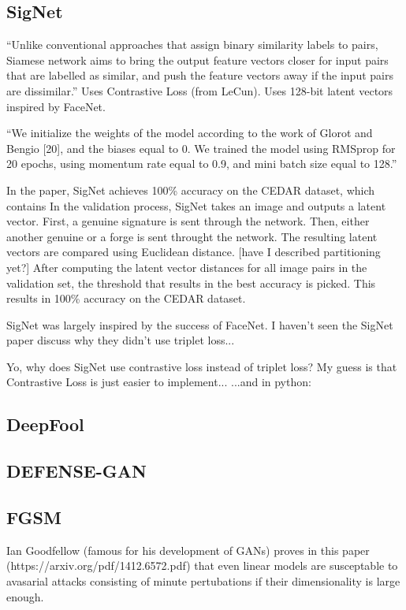 \subsection{SigNet}
``Unlike conventional approaches that assign
binary similarity labels to pairs, Siamese network aims to bring
the output feature vectors closer for input pairs that are labelled
as similar, and push the feature vectors away if the input pairs
are dissimilar.''
Uses Contrastive Loss (from LeCun).
Uses 128-bit latent vectors inspired by FaceNet.

``We initialize the weights of the model according to the work
of Glorot and Bengio [20], and the biases equal to 0. We trained
the model using RMSprop for 20 epochs, using momentum rate
equal to 0.9, and mini batch size equal to 128.''

In the paper, SigNet achieves 100\% accuracy on the CEDAR dataset, which contains 
In the validation process, SigNet takes an image and outputs a latent vector.
First, a genuine signature is sent through the network.
Then, either another genuine or a forge is sent throught the network.
The resulting latent vectors are compared using Euclidean distance.
[have I described partitioning yet?]
After computing the latent vector distances for all image pairs in the validation set, the threshold that results in the best accuracy is picked.
This results in 100\% accuracy on the CEDAR dataset.

SigNet was largely inspired by the success of FaceNet.
I haven't seen the SigNet paper discuss why they didn't use triplet loss...

Yo, why does SigNet use contrastive loss instead of triplet loss?
    My guess is that Contrastive Loss is just easier to implement...
\cite{sig_net}
\cite{GitHub_sounakdey}
...and in python: \cite{GitHub_signet_pytorch}

\subsection{DeepFool}
\subsection{DEFENSE-GAN}

\subsection{FGSM}
Ian Goodfellow (famous for his development of GANs) proves in this paper (https://arxiv.org/pdf/1412.6572.pdf) that even linear models are susceptable to avasarial attacks consisting of minute pertubations if their dimensionality is large enough.

